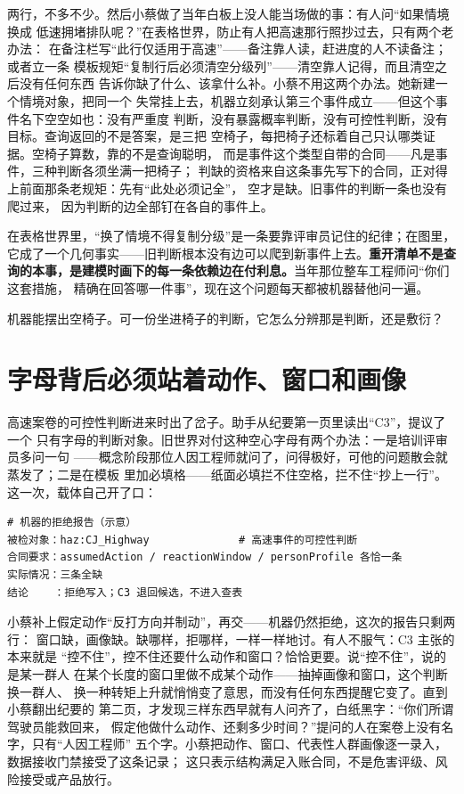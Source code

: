 两行，不多不少。然后小蔡做了当年白板上没人能当场做的事：有人问“如果情境换成
低速拥堵排队呢？”在表格世界，防止有人把高速那行照抄过去，只有两个老办法：
在备注栏写“此行仅适用于高速”——备注靠人读，赶进度的人不读备注；或者立一条
模板规矩“复制行后必须清空分级列”——清空靠人记得，而且清空之后没有任何东西
告诉你缺了什么、该拿什么补。小蔡不用这两个办法。她新建一个情境对象，把同一个
失常挂上去，机器立刻承认第三个事件成立——但这个事件名下空空如也：没有严重度
判断，没有暴露概率判断，没有可控性判断，没有目标。查询返回的不是答案，是三把
空椅子，每把椅子还标着自己只认哪类证据。空椅子算数，靠的不是查询聪明，
而是事件这个类型自带的合同——凡是事件，三种判断各须坐满一把椅子；
判缺的资格来自这条事先写下的合同，正对得上前面那条老规矩：先有“此处必须记全”，
空才是缺。旧事件的判断一条也没有爬过来，
因为判断的边全部钉在各自的事件上。

在表格世界里，“换了情境不得复制分级”是一条要靠评审员记住的纪律；在图里，
它成了一个几何事实——旧判断根本没有边可以爬到新事件上去。\textbf{重开清单不是查询的本事，是建模时画下的每一条依赖边在付利息。}当年那位整车工程师问“你们这套措施，
精确在回答哪一件事”，现在这个问题每天都被机器替他问一遍。

机器能摆出空椅子。可一份坐进椅子的判断，它怎么分辨那是判断，还是敷衍？

\section{字母背后必须站着动作、窗口和画像}

高速案卷的可控性判断进来时出了岔子。助手从纪要第一页里读出“C3”，提议了一个
只有字母的判断对象。旧世界对付这种空心字母有两个办法：一是培训评审员多问一句
——概念阶段那位人因工程师就问了，问得极好，可他的问题散会就蒸发了；二是在模板
里加必填格——纸面必填拦不住空格，拦不住“抄上一行”。这一次，载体自己开了口：

\nopagebreak[4]
\begin{codebox}
\begin{Verbatim}[fontsize=\small,breaklines=true,breakanywhere=true,breaksymbolleft={},breaksymbolright={}]
# 机器的拒绝报告（示意）
被检对象：haz:CJ_Highway              # 高速事件的可控性判断
合同要求：assumedAction / reactionWindow / personProfile 各恰一条
实际情况：三条全缺
结论    ：拒绝写入；C3 退回候选，不进入查表
\end{Verbatim}
\end{codebox}

小蔡补上假定动作“反打方向并制动”，再交——机器仍然拒绝，这次的报告只剩两行：
窗口缺，画像缺。缺哪样，拒哪样，一样一样地讨。有人不服气：C3 主张的本来就是
“控不住”，控不住还要什么动作和窗口？恰恰更要。说“控不住”，说的是某一群人
在某个长度的窗口里做不成某个动作——抽掉画像和窗口，这个判断换一群人、
换一种转矩上升就悄悄变了意思，而没有任何东西提醒它变了。直到小蔡翻出纪要的
第二页，才发现三样东西早就有人问齐了，白纸黑字：“你们所谓驾驶员能救回来，
假定他做什么动作、还剩多少时间？”提问的人在案卷上没有名字，只有“人因工程师”
五个字。小蔡把动作、窗口、代表性人群画像逐一录入，数据接收门禁接受了这条记录；
这只表示结构满足入账合同，不是危害评级、风险接受或产品放行。

